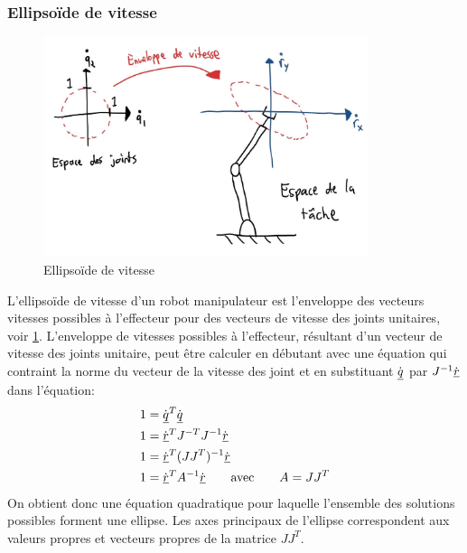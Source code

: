 \subsubsection{Ellipsoïde de vitesse}

\begin{figure}[htb]
	\centering
		\includegraphics[width=0.85\textwidth]{fig/velocitymanipulabilityellipsoid.jpg}
	\caption{Ellipsoïde de vitesse}
	\label{fig:manipulabilityellipsoid}
\end{figure}

L'ellipsoïde de vitesse d'un robot manipulateur est l'enveloppe des vecteurs vitesses possibles à l'effecteur pour des vecteurs de vitesse des joints unitaires, voir \ref{fig:manipulabilityellipsoid}. L'enveloppe de vitesses possibles à l'effecteur, résultant d'un vecteur de vitesse des joints unitaire, peut être calculer en débutant avec une équation qui contraint la norme du vecteur de la vitesse des joint et en substituant $\dot{\underline{q}}$ par $J^{-1} \dot{\underline{r}}$ dans l'équation:
\begin{align}
1 &= \dot{\underline{q}}^T \dot{\underline{q}} \\
1 &= \dot{\underline{r}}^T J^{-T} J^{-1} \dot{\underline{r}} \\
1 &= \dot{\underline{r}}^T (J J^T)^{-1} \dot{\underline{r}} \\
1 &= \dot{\underline{r}}^T A^{-1} \dot{\underline{r}} \quad\quad \text{avec} \quad\quad A = J J^T
\end{align} 
On obtient donc une équation quadratique pour laquelle l'ensemble des solutions possibles forment une ellipse. Les axes principaux de l'ellipse correspondent aux valeurs propres et vecteurs propres de la matrice $J J^T$. 

